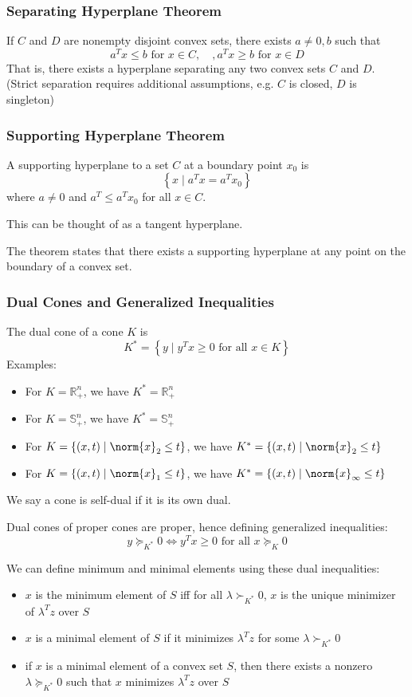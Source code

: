 \documentclass[11pt]{article}
\begin{document}
\subsubsection{Separating Hyperplane Theorem} 
If $C$ and $D$ are nonempty disjoint convex sets, there exists $a \neq 0, b$ such that 
\[ a^Tx \leq b \text{ for } x \in C, \quad, a^Tx \geq b \text{ for } x \in D \] 
That is, there exists a hyperplane separating any two convex sets $C$ and $D$. (Strict separation requires additional assumptions, e.g. $C$ is closed, $D$ is singleton)
\subsubsection*{Supporting Hyperplane Theorem} 
A supporting hyperplane to a set $C$ at a boundary point $x_0$ is 
\[ \left\{ x \mid a^Tx = a^Tx_0 \right\}  \] 
where $a \neq 0$ and $a^T \leq a^Tx_0$ for all $x \in C$. \par
This can be thought of as a tangent hyperplane. \par 
The theorem states that there exists a supporting hyperplane at any point on the boundary of a convex set. \par 

\subsubsection*{Dual Cones and Generalized Inequalities}
The dual cone of a cone $K$ is 
\[ K^* = \left\{ y \mid y^Tx \geq 0 \text{ for all } x \in K \right\} \] 
Examples: 
\begin{itemize}
    \item For $K = \mathbb{R}^n_+$, we have $K^* = \mathbb{R}^n_+$
    \item For $K = \mathbb{S}_+^n$, we have $K^* = \mathbb{S}_+^n$
    \item For $K = \left\{ (x, t) \mid \norm{x}_2 \leq t \right\}$, we have $K^* = \left\{ (x, t) \mid \norm{x}_2 \leq t \right\}$ 
    \item For $K = \left\{ (x, t) \mid \norm{x}_1 \leq t \right\}$, we have $K^* = \left\{ (x, t) \mid \norm{x}_\infty \leq t \right\}$ 
\end{itemize}
We say a cone is self-dual if it is its own dual. \par 
Dual cones of proper cones are proper, hence defining generalized inequalities: 
\[ y \succeq_{K^*} 0 \Leftrightarrow y^Tx \geq 0 \text{ for all } x \succeq_K 0 \] 

We can define minimum and minimal elements using these dual inequalities: 
\begin{itemize}
    \item $x$ is the minimum element of $S$ iff for all $\lambda \succ_{K^*} 0$, $x$ is the unique minimizer of $\lambda^Tz$ over $S$
    \item $x$ is a minimal element of $S$ if it minimizes $\lambda^Tz$ for some $\lambda \succ_{K^*} 0$
    \item if $x$ is a minimal element of a convex set $S$, then there exists a nonzero $\lambda \succeq_{K^*} 0$ such that $x$ minimizes $\lambda^Tz$ over $S$
\end{itemize}
\end{document}
